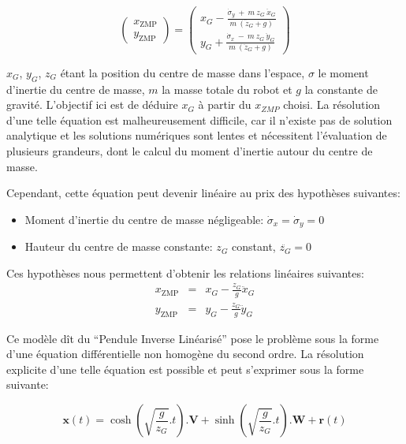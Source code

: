 \begin{equation}
\left(
\begin{array}{cc}
x_{\text{ZMP}}\\
y_{\text{ZMP}}
\end{array}
\right) = \left(
\begin{array}{cc}
x_G - \frac{\dot{\sigma}_y\ +\ m\ z_G\ \ddot{x}_G}{m\ (\ddot{z}_G + g)}\\
y_G + \frac{\dot{\sigma}_x\ -\ m\ z_G\ \ddot{y}_G}{m\ (\ddot{z}_G + g)}
\end{array}
\right)
\end{equation}

$x_G$, $y_G$, $z_G$ étant la position du centre de masse dans
l'espace, $\sigma$ le moment d'inertie du centre de masse, $m$ la
masse totale du robot et $g$ la constante de gravité. L'objectif ici
est de déduire $x_{G}$ à partir du $x_{ZMP}$ choisi. La résolution
d'une telle équation est malheureusement difficile, car il n'existe
pas de solution analytique et les solutions numériques sont lentes et
nécessitent l'évaluation de plusieurs grandeurs, dont le calcul du
moment d'inertie autour du centre de masse.

Cependant, cette équation peut devenir linéaire au prix des hypothèses
suivantes:
\begin{itemize}
\item Moment d'inertie du centre de masse négligeable: $\dot{\sigma}_x = \dot{\sigma}_y = 0$
\item Hauteur du centre de masse constante: $z_G$ constant, $\ddot{z_G} = 0$
\end{itemize}

Ces hypothèses nous permettent d'obtenir les relations linéaires suivantes:
\begin{eqnarray*}
x_{\text{ZMP}} &=& x_G - \frac{z_G}{g} \ddot{x}_G\\
y_{\text{ZMP}} &=& y_G - \frac{z_G}{g} \ddot{y}_G
\end{eqnarray*}

Ce modèle dît du ``Pendule Inverse Linéarisé'' pose le problème sous
la forme d'une équation différentielle non homogène du second
ordre. La résolution explicite d'une telle équation est possible et
peut s'exprimer sous la forme suivante:

\begin{equation}
  \mathbf{x}(t) = \cosh(\sqrt{\frac{g}{z_G}}.t) . \mathbf{V} + \sinh(\sqrt{\frac{g}{z_G}}.t) . \mathbf{W} + \mathbf{r}(t)
\end{equation}

